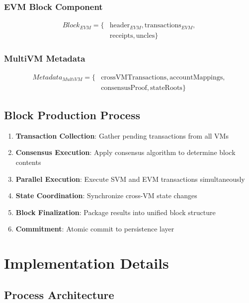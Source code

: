 \documentclass[11pt,a4paper]{article}
\begin{document}
\subsubsection{EVM Block Component}
\begin{align}
Block_{EVM} = \{&\text{header}_{EVM}, \text{transactions}_{EVM}, \\
                &\text{receipts}, \text{uncles}\}
\end{align}

\subsubsection{MultiVM Metadata}
\begin{align}
Metadata_{MultiVM} = \{&\text{crossVMTransactions}, \text{accountMappings}, \\
                       &\text{consensusProof}, \text{stateRoots}\}
\end{align}

\subsection{Block Production Process}

\begin{enumerate}
    \item \textbf{Transaction Collection}: Gather pending transactions from all VMs
    \item \textbf{Consensus Execution}: Apply consensus algorithm to determine block contents
    \item \textbf{Parallel Execution}: Execute SVM and EVM transactions simultaneously
    \item \textbf{State Coordination}: Synchronize cross-VM state changes
    \item \textbf{Block Finalization}: Package results into unified block structure
    \item \textbf{Commitment}: Atomic commit to persistence layer
\end{enumerate}

\section{Implementation Details}

\subsection{Process Architecture}
\end{document}
